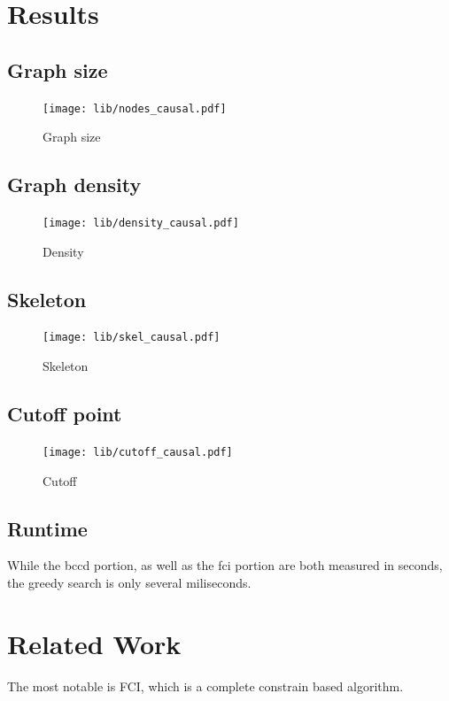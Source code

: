\documentclass[11pt,a4paper]{report}
\begin{document}
\chapter{Results}\label{results}

\section{Graph size}
\begin{figure}
  \centering
  \texttt{[image: lib/nodes\_causal.pdf]}
  \caption{Graph size}
  \label{nodes_causal}
\end{figure}

\section{Graph density}
\begin{figure}
  \centering
  \texttt{[image: lib/density\_causal.pdf]}
  \caption{Density}
  \label{density_causal}
\end{figure}

\section{Skeleton}
\begin{figure}
  \centering
  \texttt{[image: lib/skel\_causal.pdf]}
  \caption{Skeleton}
  \label{skel_causal}
\end{figure}

\section{Cutoff point}
\begin{figure}
  \centering
  \texttt{[image: lib/cutoff\_causal.pdf]}
  \caption{Cutoff}
  \label{cutoff_causal}
\end{figure}

\section{Runtime}\label{runtime}
While the bccd portion, as well as the fci portion are both measured in
seconds, the greedy search is only several miliseconds.

\chapter{Related Work}\label{relatedwork}
The most notable is
FCI\cite{spirtesCausationPredictionSearch2000}, which is a complete
\cite{zhangCompletenessOrientationRules2008} constrain based algorithm.
\end{document}
